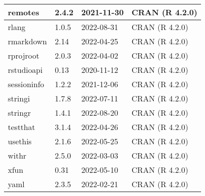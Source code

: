 \documentclass[
]{book}
\theoremstyle{definition}
\theoremstyle{definition}
\theoremstyle{definition}
\theoremstyle{definition}
\theoremstyle{remark}
\begin{document}
\begin{tabular}{l|l|l|l}
remotes & 2.4.2 & 2021-11-30 & CRAN (R 4.2.0)\\
\hline
rlang & 1.0.5 & 2022-08-31 & CRAN (R 4.2.0)\\
\hline
rmarkdown & 2.14 & 2022-04-25 & CRAN (R 4.2.0)\\
\hline
rprojroot & 2.0.3 & 2022-04-02 & CRAN (R 4.2.0)\\
\hline
rstudioapi & 0.13 & 2020-11-12 & CRAN (R 4.2.0)\\
\hline
sessioninfo & 1.2.2 & 2021-12-06 & CRAN (R 4.2.0)\\
\hline
stringi & 1.7.8 & 2022-07-11 & CRAN (R 4.2.0)\\
\hline
stringr & 1.4.1 & 2022-08-20 & CRAN (R 4.2.0)\\
\hline
testthat & 3.1.4 & 2022-04-26 & CRAN (R 4.2.0)\\
\hline
usethis & 2.1.6 & 2022-05-25 & CRAN (R 4.2.0)\\
\hline
withr & 2.5.0 & 2022-03-03 & CRAN (R 4.2.0)\\
\hline
xfun & 0.31 & 2022-05-10 & CRAN (R 4.2.0)\\
\hline
yaml & 2.3.5 & 2022-02-21 & CRAN (R 4.2.0)\\
\hline
\end{tabular}

  
\end{document}
